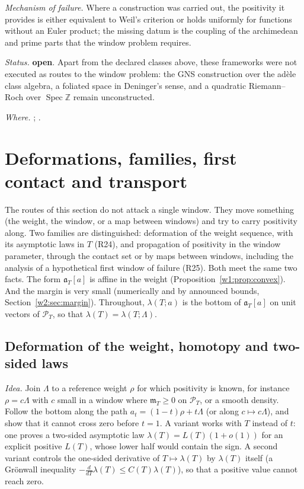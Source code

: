 \documentclass[11pt]{amsart}
\theoremstyle{definition}
\theoremstyle{remark}
\numberwithin{equation}{section}
\newcommand{\Z}{\mathbb{Z}}
\newcommand{\PT}{\mathcal{P}_T}                        %
\newcommand{\mT}{\mathfrak{m}_T}                       %
\newcommand{\aT}{\mathfrak{a}_T}                       %
\newcommand{\lam}{\lambda(T)}                          %
\newcommand{\rtag}[1]{\textbf{\small\textsf{#1}}}
\newcommand{\openR}{\rtag{open}}
\newcommand{\entry}[1]{\par\smallskip\noindent\textit{#1.}\enspace}
\begin{document}
\entry{Mechanism of failure} Where a construction was carried out, the positivity it provides is either
equivalent to Weil's criterion or holds uniformly for functions without an Euler product; the missing datum is
the coupling of the archimedean and prime parts that the window problem requires.

\entry{Status} \openR. Apart from the declared classes above, these frameworks were not executed as routes to
the window problem: the GNS construction over the ad\`ele class algebra, a foliated space in Deninger's sense,
and a quadratic Riemann--Roch over $\operatorname{Spec}\Z$ remain unconstructed.

\entry{Where} \cite{Connes1999,ConnesConsani2021,Deninger1998,BostConnes1995,Meyer2005}; \cite{P42}.


\section{Deformations, families, first contact and transport}\label{w8:sec:families}

The routes of this section do not attack a single window. They move something (the weight, the window, or a map
between windows) and try to carry positivity along. Two families are distinguished: deformation of the weight
sequence, with its asymptotic laws in $T$ (R24), and propagation of positivity in the window parameter, through the
contact set or by maps between windows, including the analysis of a hypothetical first window of failure (R25).
Both meet the same two facts. The form $\aT[a]$ is affine in the weight (Proposition~\ref{w1:prop:convex}).
And the margin is very small (numerically and by announced bounds, Section~\ref{w2:sec:margin}). Throughout, $\lambda(T;a)$ is the bottom of $\aT[a]$ on unit
vectors of $\PT$, so that $\lam=\lambda(T;\Lambda)$.

\subsection{Deformation of the weight, homotopy and two-sided laws}\label{w8:fam:R24}

\entry{Idea} Join $\Lambda$ to a reference weight $\rho$ for which positivity is known, for instance $\rho=c\Lambda$
with $c$ small in a window where $\mT\ge0$ on $\PT$, or a smooth density. Follow the bottom along the path
$a_t=(1-t)\rho+t\Lambda$ (or along $c\mapsto c\Lambda$), and show that it cannot cross zero before $t=1$. A variant
works with $T$ instead of $t$: one proves a two-sided asymptotic law $\lam=L(T)(1+o(1))$ for an explicit positive
$L(T)$, whose lower half would contain the sign. A second variant controls the one-sided derivative of $T\mapsto\lam$
by $\lam$ itself (a Gr\"onwall inequality $-\frac{d}{dT}\lam\le C(T)\lam$), so that a positive value cannot reach zero.
\end{document}
